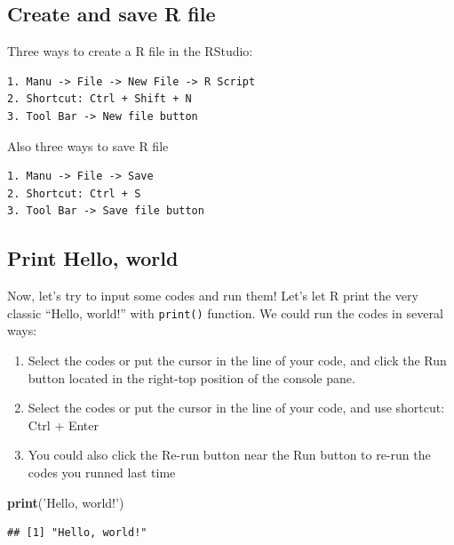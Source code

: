 \documentclass[]{book}
\newenvironment{Shaded}{\begin{snugshade}}{\end{snugshade}}
\newcommand{\KeywordTok}[1]{\textcolor[rgb]{0.13,0.29,0.53}{\textbf{#1}}}
\newcommand{\NormalTok}[1]{#1}
\newcommand{\StringTok}[1]{\textcolor[rgb]{0.31,0.60,0.02}{#1}}
\providecommand{\tightlist}{%
  \setlength{\itemsep}{0pt}\setlength{\parskip}{0pt}}
\begin{document}
\hypertarget{create-and-save-r-file}{%
\subsection{Create and save R file}\label{create-and-save-r-file}}

Three ways to create a R file in the RStudio:

\begin{verbatim}
1. Manu -> File -> New File -> R Script
2. Shortcut: Ctrl + Shift + N
3. Tool Bar -> New file button
\end{verbatim}

Also three ways to save R file

\begin{verbatim}
1. Manu -> File -> Save
2. Shortcut: Ctrl + S
3. Tool Bar -> Save file button
\end{verbatim}

\hypertarget{print-hello-world}{%
\subsection{Print Hello, world}\label{print-hello-world}}

Now, let's try to input some codes and run them! Let's let R print the very classic ``Hello, world!'' with \texttt{print()} function.
We could run the codes in several ways:

\begin{enumerate}
\def\labelenumi{\arabic{enumi}.}
\tightlist
\item
  Select the codes or put the cursor in the line of your code, and click the Run button located in the right-top position of the console pane.
\item
  Select the codes or put the cursor in the line of your code, and use shortcut: Ctrl + Enter
\item
  You could also click the Re-run button near the Run button to re-run the codes you runned last time
\end{enumerate}

\begin{Shaded}
\begin{Highlighting}[]
\KeywordTok{print}\NormalTok{(}\StringTok{'Hello, world!'}\NormalTok{)}
\end{Highlighting}
\end{Shaded}

\begin{verbatim}
## [1] "Hello, world!"
\end{verbatim}
\end{document}
